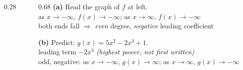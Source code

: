 \documentclass[aspectratio=169, 11pt]{beamer}
\newcommand{\lgrid}[4]{%
  \draw[step=1, linegray!40, very thin] (#1,#3) grid (#2,#4);
  \draw[->, semithick, charcoal] (#1,0)--(#2,0) node[below left, font=\tiny]{$x$};
  \draw[->, semithick, charcoal] (0,#3)--(0,#4) node[below left, font=\tiny]{$y$};}
\begin{document}
\begin{frame}[t, plain]
  \begin{columns}[T]
    \begin{column}{0.28\textwidth}
      \centering
    \end{column}
    \begin{column}{0.68\textwidth}
      \textbf{(a)} Read the graph of $f$ at left. \pause \\[2pt]
      \hspace*{1em}as $x\to-\infty$, $f(x)\to-\infty$; \; as $x\to\infty$, $f(x)\to-\infty$
      \pause \\[2pt]
      \hspace*{1em}both ends fall $\Rightarrow$ \emph{even} degree, \emph{negative} leading
      coefficient \pause
      \vspace{10pt}

      \textbf{(b)} Predict: $g(x)=5x^2-2x^3+1$. \pause \\[2pt]
      \hspace*{1em}leading term $-2x^3$ \emph{(highest power, not first written)} \pause \\[2pt]
      \hspace*{1em}odd, negative: as $x\to-\infty$, $g(x)\to\infty$; \; as $x\to\infty$,
      $g(x)\to-\infty$
    \end{column}
  \end{columns}
\end{frame}
\end{document}
